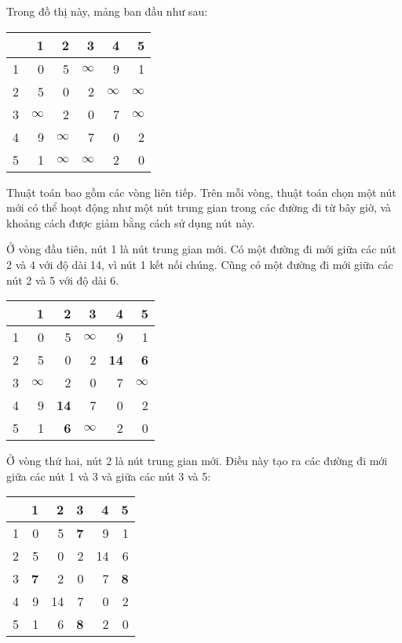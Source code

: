 Trong đồ thị này, mảng ban đầu như sau:
\begin{center}
\begin{tabular}{r|rrrrr}
 & 1 & 2 & 3 & 4 & 5 \\
\hline
1 & 0 & 5 & $\infty$ & 9 & 1 \\
2 & 5 & 0 & 2 & $\infty$ & $\infty$ \\
3 & $\infty$ & 2 & 0 & 7 & $\infty$ \\
4 & 9 & $\infty$ & 7 & 0 & 2 \\
5 & 1 & $\infty$ & $\infty$ & 2 & 0 \\
\end{tabular}
\end{center}
\vspace{10pt}
Thuật toán bao gồm các vòng liên tiếp.
Trên mỗi vòng, thuật toán chọn một nút mới
có thể hoạt động như một nút trung gian trong các đường đi từ bây giờ,
và khoảng cách được giảm bằng cách sử dụng nút này.

Ở vòng đầu tiên, nút 1 là nút trung gian mới.
Có một đường đi mới giữa các nút 2 và 4
với độ dài 14, vì nút 1 kết nối chúng.
Cũng có một đường đi mới
giữa các nút 2 và 5 với độ dài 6.

\begin{center}
\begin{tabular}{r|rrrrr}
 & 1 & 2 & 3 & 4 & 5 \\
\hline
1 & 0 & 5 & $\infty$ & 9 & 1 \\
2 & 5 & 0 & 2 & \textbf{14} & \textbf{6} \\
3 & $\infty$ & 2 & 0 & 7 & $\infty$ \\
4 & 9 & \textbf{14} & 7 & 0 & 2 \\
5 & 1 & \textbf{6} & $\infty$ & 2 & 0 \\
\end{tabular}
\end{center}
\vspace{10pt}

Ở vòng thứ hai, nút 2 là nút trung gian mới.
Điều này tạo ra các đường đi mới giữa các nút 1 và 3
và giữa các nút 3 và 5:

\begin{center}
\begin{tabular}{r|rrrrr}
 & 1 & 2 & 3 & 4 & 5 \\
\hline
1 & 0 & 5 & \textbf{7} & 9 & 1 \\
2 & 5 & 0 & 2 & 14 & 6 \\
3 & \textbf{7} & 2 & 0 & 7 & \textbf{8} \\
4 & 9 & 14 & 7 & 0 & 2 \\
5 & 1 & 6 & \textbf{8} & 2 & 0 \\
\end{tabular}
\end{center}
\vspace{10pt}

